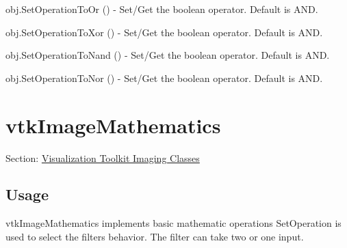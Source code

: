 \begin{DoxyItemize}
\item {\ttfamily obj.\-Set\-Operation\-To\-Or ()} -\/ Set/\-Get the boolean operator. Default is A\-N\-D.  
\item {\ttfamily obj.\-Set\-Operation\-To\-Xor ()} -\/ Set/\-Get the boolean operator. Default is A\-N\-D.  
\item {\ttfamily obj.\-Set\-Operation\-To\-Nand ()} -\/ Set/\-Get the boolean operator. Default is A\-N\-D.  
\item {\ttfamily obj.\-Set\-Operation\-To\-Nor ()} -\/ Set/\-Get the boolean operator. Default is A\-N\-D.  
\end{DoxyItemize}\hypertarget{vtkimaging_vtkimagemathematics}{}\section{vtk\-Image\-Mathematics}\label{vtkimaging_vtkimagemathematics}
Section\-: \hyperlink{sec_vtkimaging}{Visualization Toolkit Imaging Classes} \hypertarget{vtkwidgets_vtkxyplotwidget_Usage}{}\subsection{Usage}\label{vtkwidgets_vtkxyplotwidget_Usage}
vtk\-Image\-Mathematics implements basic mathematic operations Set\-Operation is used to select the filters behavior. The filter can take two or one input.


